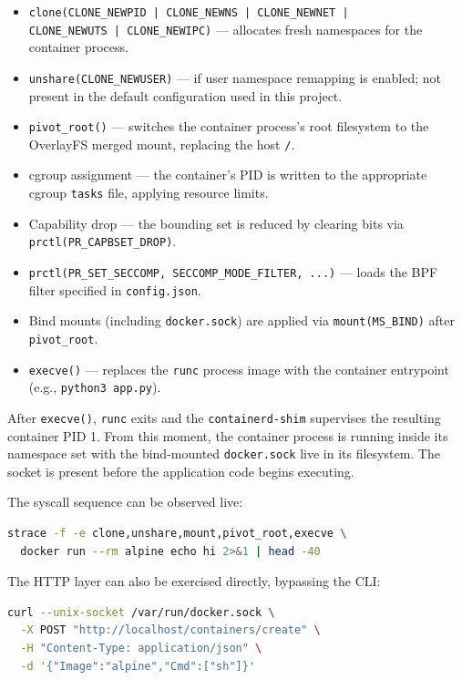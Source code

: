 \begin{itemize}
    \item \texttt{clone(CLONE\_NEWPID | CLONE\_NEWNS | CLONE\_NEWNET |} \\
          \texttt{CLONE\_NEWUTS | CLONE\_NEWIPC)} --- allocates fresh namespaces for
          the container process.
    \item \texttt{unshare(CLONE\_NEWUSER)} --- if user namespace remapping is
          enabled; not present in the default configuration used in this project.
    \item \texttt{pivot\_root()} --- switches the container process's root filesystem
          to the OverlayFS merged mount, replacing the host \texttt{/}.
    \item cgroup assignment --- the container's PID is written to the appropriate
          cgroup \texttt{tasks} file, applying resource limits.
    \item Capability drop --- the bounding set is reduced by clearing bits via
          \texttt{prctl(PR\_CAPBSET\_DROP)}.
    \item \texttt{prctl(PR\_SET\_SECCOMP, SECCOMP\_MODE\_FILTER, ...)} --- loads the
          BPF filter specified in \texttt{config.json}.
    \item Bind mounts (including \texttt{docker.sock}) are applied via
          \texttt{mount(MS\_BIND)} after \texttt{pivot\_root}.
    \item \texttt{execve()} --- replaces the \texttt{runc} process image with the
          container entrypoint (e.g., \texttt{python3 app.py}).
\end{itemize}

After \texttt{execve()}, \texttt{runc} exits and the \texttt{containerd-shim}
supervises the resulting container PID 1. From this moment, the container process is
running inside its namespace set with the bind-mounted \texttt{docker.sock} live in
its filesystem. The socket is present before the application code begins executing.

The syscall sequence can be observed live:

\begin{lstlisting}[language=bash]
strace -f -e clone,unshare,mount,pivot_root,execve \
  docker run --rm alpine echo hi 2>&1 | head -40
\end{lstlisting}

The HTTP layer can also be exercised directly, bypassing the CLI:

\begin{lstlisting}[language=bash]
curl --unix-socket /var/run/docker.sock \
  -X POST "http://localhost/containers/create" \
  -H "Content-Type: application/json" \
  -d '{"Image":"alpine","Cmd":["sh"]}'
\end{lstlisting}

